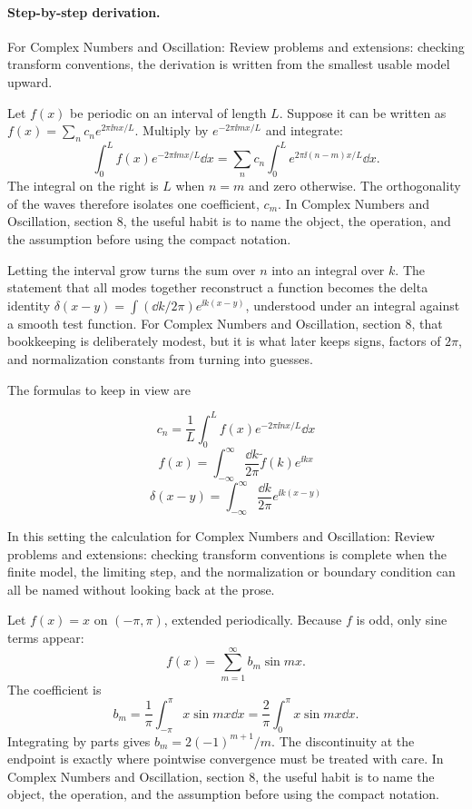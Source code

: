 \paragraph{Step-by-step derivation.}

For Complex Numbers and Oscillation: Review problems and extensions: checking transform conventions, the derivation is written from the smallest usable model upward.

Let \(f(x)\) be periodic on an interval of length \(L\).  Suppose it can be written as \(f(x)=\sum_n c_ne^{2\pi\ii nx/L}\).  Multiply by \(e^{-2\pi\ii mx/L}\) and integrate:
\[
  \int_0^L f(x)e^{-2\pi\ii mx/L}\dd x
  =
  \sum_n c_n\int_0^L e^{2\pi\ii(n-m)x/L}\dd x.
\]
The integral on the right is \(L\) when \(n=m\) and zero otherwise.  The orthogonality of the waves therefore isolates one coefficient, \(c_m\).  In Complex Numbers and Oscillation, section 8, the useful habit is to name the object, the operation, and the assumption before using the compact notation.

Letting the interval grow turns the sum over \(n\) into an integral over \(k\).  The statement that all modes together reconstruct a function becomes the delta identity \(\delta(x-y)=\int(\dd k/2\pi)e^{\ii k(x-y)}\), understood under an integral against a smooth test function.  For Complex Numbers and Oscillation, section 8, that bookkeeping is deliberately modest, but it is what later keeps signs, factors of \(2\pi\), and normalization constants from turning into guesses.

The formulas to keep in view are

\[
  c_n=\frac1L\int_0^L f(x)e^{-2\pi\ii nx/L}\dd x
\]
\[
  f(x)=\int_{-\infty}^{\infty}\frac{\dd k}{2\pi}\tilde f(k)e^{\ii kx}
\]
\[
  \delta(x-y)=\int_{-\infty}^{\infty}\frac{\dd k}{2\pi}e^{\ii k(x-y)}
\]

In this setting the calculation for Complex Numbers and Oscillation: Review problems and extensions: checking transform conventions is complete when the finite model, the limiting step, and the normalization or boundary condition can all be named without looking back at the prose.




\begin{example}
Let \(f(x)=x\) on \((-\pi,\pi)\), extended periodically.  Because \(f\) is odd, only sine terms appear:
\[
  f(x)=\sum_{m=1}^\infty b_m\sin mx.
\]
The coefficient is
\[
  b_m=\frac1\pi\int_{-\pi}^\pi x\sin mx\dd x
  =\frac2\pi\int_0^\pi x\sin mx\dd x.
\]
Integrating by parts gives \(b_m=2(-1)^{m+1}/m\).  The discontinuity at the endpoint is exactly where pointwise convergence must be treated with care.  In Complex Numbers and Oscillation, section 8, the useful habit is to name the object, the operation, and the assumption before using the compact notation.
\end{example}



